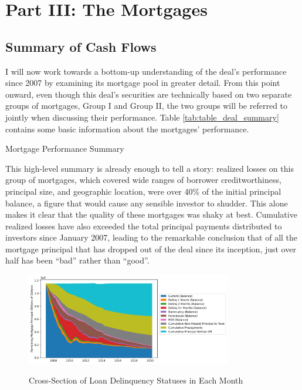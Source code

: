 \documentclass[12pt]{article}
\begin{document}
\section*{Part III: The Mortgages}
\subsection*{Summary of Cash Flows}

I will now work towards a bottom-up understanding of the deal's performance since 2007 by examining its mortgage pool in greater detail. From this point onward, even though this deal’s securities are technically based on two separate groups of mortgages, Group I and Group II, the two groups will be referred to jointly when discussing their performance. Table \ref{tab:table_deal_summary} contains some basic information about the mortgages’ performance.

\begin{table}[h]
	\centering
	\caption{Mortgage Performance Summary}
	
	
	\label{tab:table_deal_summary}
\end{table}

This high-level summary is already enough to tell a story: realized losses on this group of mortgages, which covered wide ranges of borrower creditworthiness, principal size, and geographic location, were over 40\% of the initial principal balance, a figure that would cause any sensible investor to shudder. This alone makes it clear that the quality of these mortgages was shaky at best. Cumulative realized losses have also exceeded the total principal payments distributed to investors since January 2007, leading to the remarkable conclusion that of all the mortgage principal that has dropped out of the deal since its inception, just over half has been “bad” rather than “good”.

\begin{figure}[h]
	\centering
	\caption{Cross-Section of Loan Delinquency Statuses in Each Month}
	\includegraphics[width=0.8\textwidth]{../figures/stackplot_delinq_status_with_writeoffs}
	\label{fig:stackplot_delinq_status_with_writeoffs}
\end{figure}
\end{document}
